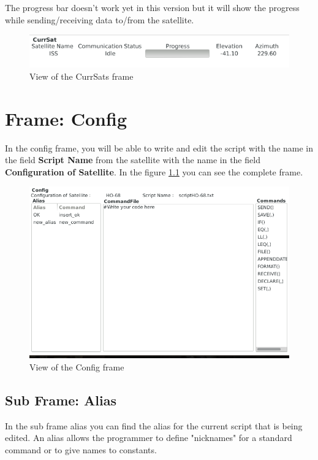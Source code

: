 \documentclass[pdftex,11pt,a4paper,titlepage]{report}
\begin{document}
The progress bar doesn't work yet in this version but it will show the progress while sending/receiving data to/from the satellite.
\begin{figure}[h]
\centering
\includegraphics[scale=0.7]{../images/CurrSatFrame.png}
\caption{View of the CurrSats frame}
\end{figure}

\chapter{Frame: Config}

\hspace{0.4cm} In the config frame, you will be able to write and edit the script with the name in the field \textbf{Script Name} from the satellite with the name in the field \textbf{Configuration of Satellite}. In the figure \ref{ConfigFrame} you can see the complete frame.
\begin{figure}[h]
\centering
\includegraphics[scale=0.6]{../images/ConfigFrame.png}
\caption{View of the Config frame}
\label{ConfigFrame}
\end{figure}
\section{Sub Frame: Alias}
\hspace{0.4cm} In the sub frame alias you can find the alias for the current script that is being edited. An alias allows the programmer to define "nicknames" for a standard command or to give names to constants.
\end{document}
